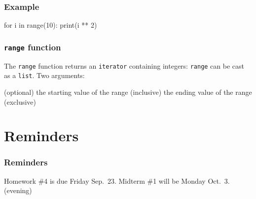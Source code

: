 \documentclass[11pt]{beamer}
\begin{document}
\begin{frame}[fragile]
  \frametitle{Example}
  \Enlarge

  \begin{semiverbatim}
for i in range(10):
    print(i ** 2)
  \end{semiverbatim}
\end{frame}

\begin{frame}[fragile]
  \frametitle{\texttt{range} function}
  \Enlarge

  \begin{itemize}
  \myitem  The \texttt{range} function returns an \texttt{iterator} containing integers:
  \myitem  \texttt{range} can be cast as a \texttt{list}.
  \myitem  Two arguments:
    \begin{itemize}
    \mysubitem  (optional) the starting value of the range (inclusive)
    \mysubitem  the ending value of the range (exclusive)
    \end{itemize}
  \end{itemize}
\end{frame}

\section{Reminders}

\begin{frame}
  \frametitle{Reminders}
  \Enlarge

  \begin{itemize}
  \myitem  Homework \#4 is due Friday Sep.\ 23.
  \myitem  Midterm \#1 will be Monday Oct.\ 3.  (evening)
  \end{itemize}
\end{frame}
\end{document}
